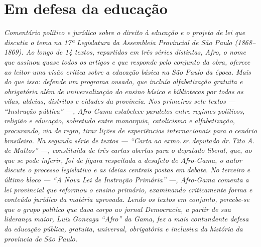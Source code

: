 \part{Em defesa da educação} %


\begin{argumento}\itshape
Comentário político e jurídico sobre o direito à educação e o projeto de
lei que discutia o tema na 17ª Legislatura da Assembleia Provincial de
São Paulo (1868--1869). Ao longo de 14 textos, repartidos em três séries distintas,
Afro, o nome que assinou quase todos os artigos e que
responde pelo conjunto da obra, oferece ao leitor uma visão crítica
sobre a educação básica na São Paulo da época. Mais do que isso: defende
um programa ousado, que incluía alfabetização gratuita e obrigatória
além de universalização do ensino básico e bibliotecas por todas as
vilas, aldeias, distritos e cidades da província. Nos primeiros sete
textos --- ``Instrução pública'' ---, Afro-Gama estabelece
paralelos entre regimes políticos, religião e educação, sobretudo entre
monarquia, catolicismo e alfabetização, procurando, via de regra, tirar
lições de experiências internacionais para o cenário brasileiro. Na
segunda série de textos --- ``Carta ao exmo.\,sr.\,deputado dr.\,Tito A. de
Mattos'' ---, constituída de três cartas abertas para o deputado
liberal, que, ao que se pode inferir, foi de figura respeitada a
desafeto de Afro-Gama, o autor discute o processo legislativo e
as ideias centrais postas em debate. No terceiro e último bloco --- ``A
Nova Lei de Instrução Primária'' ---, Afro-Gama comenta a lei
provincial que reformou o ensino primário, examinando criticamente forma
e conteúdo jurídico da matéria aprovada. Lendo os textos em conjunto,
percebe-se que o grupo político que dava corpo ao jornal
\textnormal{Democracia}, a partir de sua liderança maior, Luiz Gonzaga ``Afro''
da Gama, fez a mais contundente defesa da educação pública,
gratuita, universal, obrigatória e inclusiva da história da província de
São Paulo.
\end{argumento}


